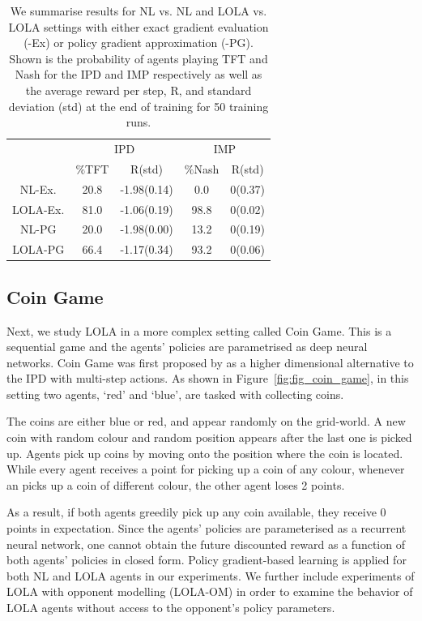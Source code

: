 
\begin{table}
\begin{center}
\begin{tabular}{|c|c|c|c|c|}
\hline
& \multicolumn{2}{c|}{IPD}   &  \multicolumn{2}{c|}{IMP} \\
& $\%$TFT & R(std) & $\%$Nash & R(std)\\
\hline
NL-Ex. &20.8 &-1.98(0.14) & 0.0& 0(0.37) \\
\hline
LOLA-Ex. &81.0 &-1.06(0.19) & 98.8 & 0(0.02) \\
\hline
NL-PG &20.0 & -1.98(0.00) & 13.2 & 0(0.19) \\
\hline
LOLA-PG &66.4  & -1.17(0.34) & 93.2 & 0(0.06) \\
\hline
\end{tabular}
\caption{We summarise results for NL vs. NL and LOLA vs. LOLA settings with either exact gradient evaluation (-Ex) or policy gradient approximation (-PG). Shown is the probability of agents playing TFT and Nash for the IPD and IMP respectively as well as the average reward per step, R, and standard deviation (std) at the end of training for 50 training runs.}
\label{tab:results}
\end{center}
\end{table}

\subsection{Coin Game}
\label{subsec:coin}
Next, we study LOLA in a more complex setting called Coin Game. This is a sequential game and the agents' policies are  parametrised as deep neural networks. Coin Game was first proposed by \citet{lerer2017maintaining} as a higher dimensional alternative to the IPD with multi-step actions. As shown in Figure~\ref{fig:fig_coin_game}, in this setting two agents, `red' and `blue', are tasked with collecting coins. 

The coins are either blue or red, and appear randomly on the grid-world. A new coin with random colour and random position appears after the last one is picked up. Agents pick up coins by moving onto the position where the coin is located. While every agent receives a point for picking up a coin of any colour, whenever an picks up a coin of different colour, the other agent loses 2 points. 

As a result, if both agents greedily pick up any coin available, they receive 0 points in expectation. Since the agents' policies are parameterised as a recurrent neural network, one cannot obtain the future discounted reward as a function of both agents' policies in closed form. Policy gradient-based learning is applied for both NL and LOLA agents in our experiments. We further include experiments of LOLA with opponent modelling (LOLA-OM) in order to examine the behavior of LOLA agents without access to the opponent's policy parameters.


